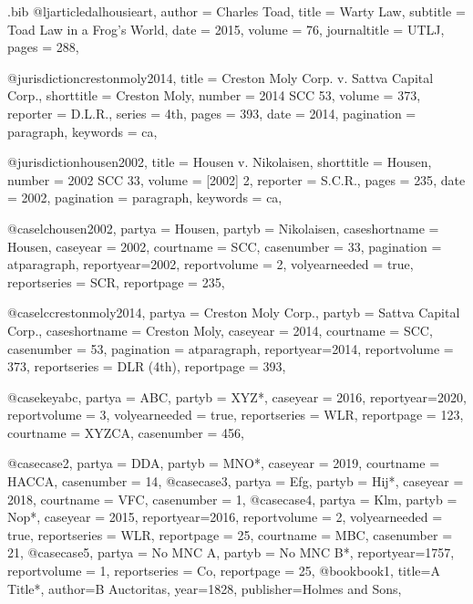 \begin{filecontents*}[overwrite]{\jobname.bib}
@ljarticle{dalhousieart,
author = {Charles Toad},
title = {Warty Law},
subtitle = {Toad Law in a Frog's World},
date = {2015},
volume = {76},
journaltitle = {UTLJ},
pages = {288},
}



@jurisdiction{crestonmoly2014,
title = {Creston Moly Corp. v. Sattva Capital Corp.},
shorttitle = {Creston Moly},
number = {2014 SCC 53},
volume = {373},
reporter = {D.L.R.},
series = {4th},
pages = {393},
date = {2014},
pagination = {paragraph},
keywords = {ca},
}

@jurisdiction{housen2002,
title = {Housen v. Nikolaisen},
shorttitle = {Housen},
number = {2002 SCC 33},
volume = {[2002] 2},
reporter = {S.C.R.},
pages = {235},
date = {2002},
pagination = {paragraph},
keywords = {ca},
}

@case{lchousen2002,
  partya = {Housen}, 
  partyb = {Nikolaisen},
  caseshortname = {Housen},
  caseyear = {2002},
  courtname = {SCC},
  casenumber = {33},
  pagination = {atparagraph},
  reportyear={2002},
  reportvolume = {2},
  volyearneeded = {true},
  reportseries = {SCR},
  reportpage = {235},
	}

@case{lccrestonmoly2014,
  partya = {Creston Moly Corp.\@}, 
  partyb = {Sattva Capital Corp.},
  caseshortname = {Creston Moly},
  caseyear = {2014},
  courtname = {SCC},
  casenumber = {53},
  pagination = {atparagraph},
  reportyear={2014},
  reportvolume = {373},
  reportseries = {DLR (4th)},
  reportpage = {393},
	}




@case{keyabc,
  partya = {ABC}, 
  partyb = {XYZ*},
  caseyear = {2016},
  reportyear={2020},
  reportvolume = {3},
  volyearneeded = {true},
  reportseries = {WLR},
  reportpage = {123},
  courtname = {XYZCA},
  casenumber = {456},
	}

@case{case2,
  partya = {DDA}, 
  partyb = {MNO*},
  caseyear = {2019},
  courtname = {HACCA},
  casenumber = {14},
	}
@case{case3,
  partya = {Efg}, 
  partyb = {Hij*},
  caseyear = {2018},
  courtname = {VFC},
  casenumber = {1},
	}
@case{case4,
  partya = {Klm}, 
  partyb = {Nop*},
  caseyear = {2015},
  reportyear={2016},
  reportvolume = {2},
  volyearneeded = {true},
  reportseries = {WLR},
  reportpage = {25},
  courtname = {MBC},
  casenumber = {21},
	}
@case{case5,
  partya = {No MNC A}, 
  partyb = {No MNC B*},
  reportyear={1757},
  reportvolume = {1},
  reportseries = {Co},
  reportpage = {25},
	}
@book{book1,
	title={A Title*},
	author={B Auctoritas},
	year={1828},
	publisher={Holmes and Sons},
	}




\end{filecontents*}
